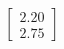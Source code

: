 \documentclass[preview]{standalone}
\begin{document}
\begin{align*}
\begin{bmatrix} 2.20 \\ 2.75 \end{bmatrix}
\end{align*}
\end{document}
